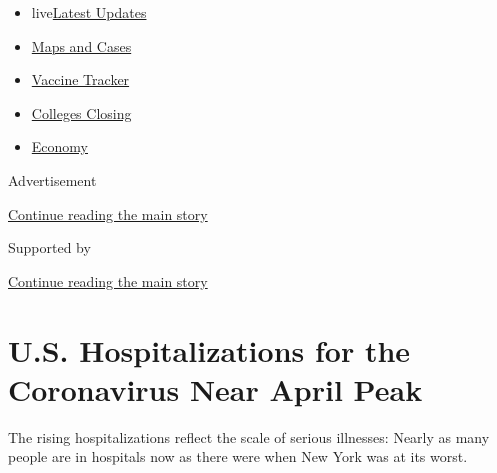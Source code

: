 \begin{itemize}
\tightlist
\item
  live\href{https://www.nytimes3xbfgragh.onion/2020/08/20/world/coronavirus-covid.html?name=styln-coronavirus-national\&region=TOP_BANNER\&variant=undefined\&block=storyline_menu_recirc\&action=click\&pgtype=Article\&impression_id=01f15491-e385-11ea-9d1b-a1f39ff1b44f}{Latest
  Updates}
\item
  \href{https://www.nytimes3xbfgragh.onion/interactive/2020/us/coronavirus-us-cases.html?name=styln-coronavirus-national\&region=TOP_BANNER\&variant=undefined\&block=storyline_menu_recirc\&action=click\&pgtype=Article\&impression_id=01f17ba0-e385-11ea-9d1b-a1f39ff1b44f}{Maps
  and Cases}
\item
  \href{https://www.nytimes3xbfgragh.onion/interactive/2020/science/coronavirus-vaccine-tracker.html?name=styln-coronavirus-national\&region=TOP_BANNER\&variant=undefined\&block=storyline_menu_recirc\&action=click\&pgtype=Article\&impression_id=01f17ba1-e385-11ea-9d1b-a1f39ff1b44f}{Vaccine
  Tracker}
\item
  \href{https://www.nytimes3xbfgragh.onion/2020/08/19/us/colleges-closing-covid.html?name=styln-coronavirus-national\&region=TOP_BANNER\&variant=undefined\&block=storyline_menu_recirc\&action=click\&pgtype=Article\&impression_id=01f17ba2-e385-11ea-9d1b-a1f39ff1b44f}{Colleges
  Closing}
\item
  \href{https://www.nytimes3xbfgragh.onion/live/2020/08/20/business/stock-market-today-coronavirus?name=styln-coronavirus-national\&region=TOP_BANNER\&variant=undefined\&block=storyline_menu_recirc\&action=click\&pgtype=Article\&impression_id=01f17ba3-e385-11ea-9d1b-a1f39ff1b44f}{Economy}
\end{itemize}

Advertisement

\protect\hyperlink{after-top}{Continue reading the main story}

Supported by

\protect\hyperlink{after-sponsor}{Continue reading the main story}

\hypertarget{us-hospitalizations-for-the-coronavirus-near-april-peak}{%
\section{U.S. Hospitalizations for the Coronavirus Near April
Peak}\label{us-hospitalizations-for-the-coronavirus-near-april-peak}}

The rising hospitalizations reflect the scale of serious illnesses:
Nearly as many people are in hospitals now as there were when New York
was at its worst.

